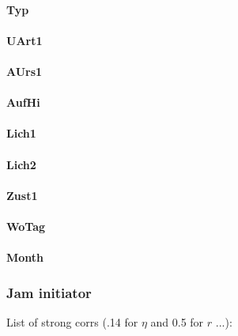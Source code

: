 \documentclass[a4paper,headsepline,footsepline,fontsize=11pt,BCOR=12mm,DIV=12]{report}
\begin{document}
\paragraph{Typ}

\paragraph{UArt1}

\paragraph{AUrs1}

\paragraph{AufHi}

\paragraph{Lich1}

\paragraph{Lich2}

\paragraph{Zust1}

\paragraph{WoTag}

\paragraph{Month}

\subsubsection{Jam initiator}

List of strong corrs (.14 for $\eta$ and 0.5 for $r$ ...):
\end{document}
